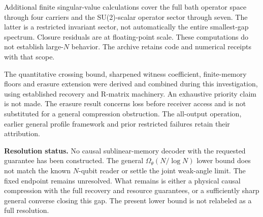 \documentclass[11pt,a4paper]{article}
\begin{document}
Additional finite singular-value calculations cover the full bath operator space through four carriers and the SU(2)-scalar operator sector through seven. The latter is a restricted invariant sector, not automatically the entire smallest-gap spectrum. Closure residuals are at floating-point scale. These computations do not establish large-$N$ behavior. The archive retains code and numerical receipts with that scope.

The quantitative crossing bound, sharpened witness coefficient, finite-memory floors and erasure extension were derived and combined during this investigation, using established recovery and R-matrix machinery. An exhaustive priority claim is not made. The erasure result concerns loss before receiver access and is not substituted for a general compression obstruction. The all-output operation, earlier general profile framework and prior restricted failures retain their attribution.

\textbf{Resolution status.} No causal sublinear-memory decoder with the requested guarantee has been constructed. The general $\Omega_\theta(N/\log N)$ lower bound does not match the known $N$-qubit reader or settle the joint weak-angle limit. The fixed endpoint remains unresolved. What remains is either a physical causal compression with the full recovery and resource guarantees, or a sufficiently sharp general converse closing this gap. The present lower bound is not relabeled as a full resolution.
\end{document}
